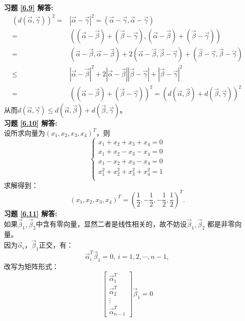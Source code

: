 \documentclass[a4paper]{book}
\begin{document}
\textbf{习题 \ref{6.9} 解答:}\\
\begin{align*}
(d(\vec{\alpha},\vec{\gamma}))^2=&|\vec{\alpha}-\vec{\gamma}|^2=(\vec{\alpha}-\vec{\gamma},\vec{\alpha}-\vec{\gamma})\\
=&((\vec{\alpha}-\vec{\beta})+(\vec{\beta}-\vec{\gamma}),(\vec{\alpha}-\vec{\beta})+(\vec{\beta}-\vec{\gamma}))\\
=&(\vec{\alpha}-\vec{\beta},\vec{\alpha}-\vec{\beta})+2(\vec{\alpha}-\vec{\beta},\vec{\beta}-\vec{\gamma})+
(\vec{\beta}-\vec{\gamma},\vec{\beta}-\vec{\gamma})\\
\leq&|\vec{\alpha}-\vec{\beta}|^2+2|\vec{\alpha}-\vec{\beta}||\vec{\beta}-\vec{\gamma}|+|\vec{\beta}-\vec{\gamma}|^2\\
=&((\vec{\alpha}-\vec{\beta})+(\vec{\beta}-\vec{\gamma}))^2=(d(\vec{\alpha},\vec{\beta})+d(\vec{\beta},\vec{\gamma}))^2
\end{align*}
从而$d(\vec{\alpha},\vec{\gamma})\leq d(\vec{\alpha},\vec{\beta})+d(\vec{\beta},\vec{\gamma})$。\\
\textbf{习题 \ref{6.10} 解答:}\\
设所求向量为$(x_1,x_2,x_3,x_4)^T$，则
\begin{equation*}
  \begin{cases}
  x_1+x_2+x_3+x_4=0\\
  x_1+x_2-x_3-x_4=0\\
  x_1-x_2+x_3-x_4=0\\
  x_1^2+x_2^2+x_3^2+x_4^2=1\\
  \end{cases}
\end{equation*}
求解得到：
\begin{equation*}
(x_1,x_2,x_3,x_4)^T=(\frac{1}{2},-\frac{1}{2},-\frac{1}{2},\frac{1}{2})^T.
\end{equation*}
\textbf{习题 \ref{6.11} 解答:}\\
如果$\vec{\beta}_1,\vec{\beta}_2$中含有零向量，显然二者是线性相关的，故不妨设$\vec{\beta}_1,\vec{\beta}_2$
都是非零向量。\\
因为$\vec{\alpha}_i$，$\vec{\beta}_1$正交，有：
\begin{equation*}
\vec{\alpha}_i^T\vec{\beta}_1=0,~i=1,2,\cdots,n-1,
\end{equation*}
改写为矩阵形式：
\begin{equation*}
\begin{bmatrix}\vec{\alpha}_1^T\\ \vec{\alpha}_2^T\\ \vdots\\ \vec{\alpha}_{n-1}^T\end{bmatrix}
\vec{\beta}_1=0
\end{equation*}
\end{document}
